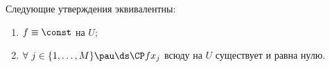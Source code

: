 
Следующие утверждения эквивалентны:
\begin{enumerate}
\item $f\equiv \const$ на $U$;
\item $\forall\ j\in\{1,\ldots,M\}\pau \ds\CP f{x_j}$ всюду на $U$ существует и равна нулю.
\end{enumerate}
